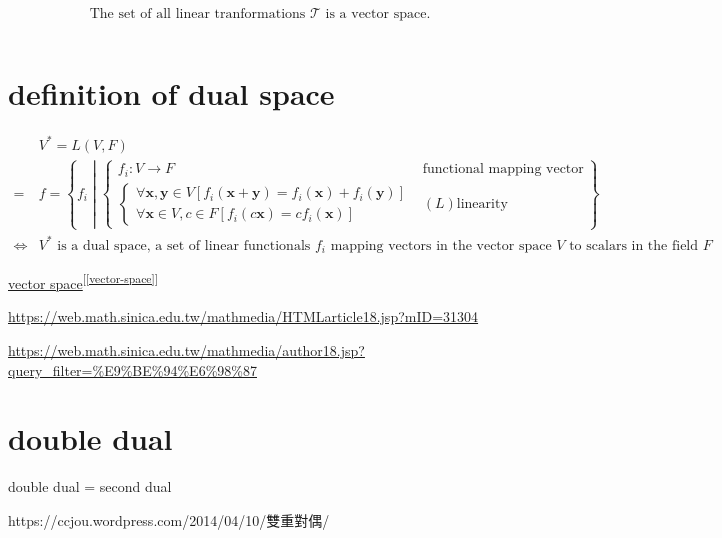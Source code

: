 \documentclass[
]{book}
\theoremstyle{definition}
\theoremstyle{definition}
\theoremstyle{definition}
\theoremstyle{definition}
\theoremstyle{remark}
\begin{document}
\[
\text{The set of all linear tranformations } \mathcal{T} \text{ is a vector space.}
\]

\[
\ \tag*{$\Box$}
\]

\section{definition of dual space}\label{definition-of-dual-space}

\[
\begin{aligned}
 & V^{*}=L\left(V,F\right)\\
= & f=\left\{ f_{{\scriptscriptstyle i}}\middle|\begin{cases}
f_{{\scriptscriptstyle i}}:V\rightarrow F & \text{functional mapping vector to field scalar}\\
\begin{cases}
\forall\boldsymbol{x},\boldsymbol{y}\in V\left[f_{{\scriptscriptstyle i}}\left(\boldsymbol{x}+\boldsymbol{y}\right)=f_{{\scriptscriptstyle i}}\left(\boldsymbol{x}\right)+f_{{\scriptscriptstyle i}}\left(\boldsymbol{y}\right)\right]\\
\forall\boldsymbol{x}\in V,c\in F\left[f_{{\scriptscriptstyle i}}\left(c\boldsymbol{x}\right)=cf_{{\scriptscriptstyle i}}\left(\boldsymbol{x}\right)\right]
\end{cases} & \left(L\right)\text{linearity}
\end{cases}\right\} \\
\Leftrightarrow & V^{*}\text{ is a dual space, a set of linear functionals }f_{{\scriptscriptstyle i}}\text{ mapping vectors in the vector space }V\text{ to scalars in the field }F
\end{aligned}
\]

\hyperref[vector-space]{vector space}\textsuperscript{{[}\ref{vector-space}{]}}

\url{https://web.math.sinica.edu.tw/mathmedia/HTMLarticle18.jsp?mID=31304}

\url{https://web.math.sinica.edu.tw/mathmedia/author18.jsp?query_filter=\%E9\%BE\%94\%E6\%98\%87}

\section{double dual}\label{double-dual}

double dual = second dual

\begin{CJK}{UTF8}{bsmi}
https://ccjou.wordpress.com/2014/04/10/雙重對偶/
\end{CJK}
\end{document}
